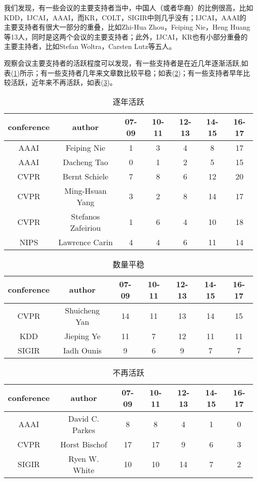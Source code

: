 \documentclass[a4paper,oneside,12pt]{article}
\begin{document}
\begin{spacing}{1.5}
我们发现，有一些会议的主要支持者当中，中国人（或者华裔）的比例很高，比如KDD，IJCAI，AAAI，而KR，COLT，SIGIR中则几乎没有；IJCAI，AAAI的主要支持者有很大一部分的重叠，比如Zhi-Hua Zhou，Feiping Nie，Heng Huang等13人，同时是这两个会议的主要支持者；此外，IJCAI，KR也有小部分重叠的主要主持者，比如Stefan Woltra，Carsten Lutz等五人。\par
观察会议主要支持者的活跃程度可以发现，有一些支持者是在近几年逐渐活跃,如表(\ref{tab1})所示；有一些支持者几年来文章数比较平稳；如表(\ref{tab2})；有一些支持者早年比较活跃，近年来不再活跃，如表(\ref{tab3})。


\begin{table}[htbp]
\caption{逐年活跃\label{tab1}}
\center
\begin{tabular}{ccccccc}
\toprule
conference & author & 07-09 & 10-11 & 12-13 & 14-15 & 16-17 \\
\midrule
AAAI& Feiping Nie &1 &3 &4 & 8 &17\\
AAAI& Dacheng Tao	&0&1&2	&5	&15\\
CVPR& Bernt Schiele	&7&	8&6	&12	&20\\
CVPR& Ming-Hsuan Yang &3	&2	&8	&14	&17\\
CVPR&Stefanos Zafeiriou		&1&	6&	4	&10&	18\\
NIPS& Lawrence Carin	&4	&4	&6	&11	&14\\
\bottomrule
\end{tabular}

\end{table}
\begin{table}[htbp]
\caption{数量平稳\label{tab2}}
\center
\begin{tabular}{ccccccc}
\toprule
conference & author & 07-09 & 10-11 & 12-13 & 14-15 & 16-17 \\
\midrule
CVPR&  Shuicheng Yan	&14&	11&13	&14	&15\\
KDD& Jieping Ye &11	&7	&12	&11	&11\\
SIGIR&Iadh Ounis	&	9&	6&	9&	7&	7\\
\bottomrule
\end{tabular}
\end{table}


\begin{table}[htbp]
\caption{不再活跃\label{tab3}}
\center
\begin{tabular}{ccccccc}
\toprule
conference & author & 07-09 & 10-11 & 12-13 & 14-15 & 16-17 \\
\midrule
AAAI&David C. Parkes		&8	&8	&4	&1&	0\\
CVPR&Horst Bischof	&17&17&9&6&3 \\
SIGIR&Ryen W. White &10&10&14&7&2\\


\end{tabular}
\end{table}
\end{spacing}
\end{document}
